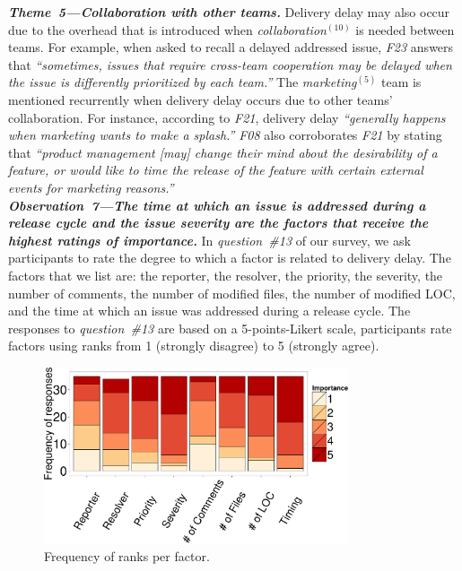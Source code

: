 \begin{sloppypar}
\noindent\textit{\textbf{Theme~5---Collaboration with other teams.}}
Delivery delay may also occur due to
the overhead that is introduced when {\em collaboration}$^{(10)}$ is needed
between teams. For example, when asked to recall a delayed addressed
issue, {\em F23} answers that {\em ``sometimes, issues that require cross-team
cooperation may be delayed when the issue is differently prioritized by each
team.''} The {\em marketing}$^{(5)}$ team is mentioned recurrently when
delivery delay occurs due to other teams' collaboration. For instance,
according to {\em F21}, delivery delay {\em ``generally happens when
marketing wants to make a splash.''} {\em F08} also corroborates  {\em F21} by
stating that {\em ``product management [may] change their mind about the
desirability of a feature, or would like to time the release of the feature with
certain external events for marketing reasons.''}\\

\noindent\textit{\textbf{Observation~7---The time at which an issue is addressed
during a release cycle and the issue severity are the factors that receive the
highest ratings of importance.}} In {\em
question~\#13} of our survey, we ask participants to rate the degree to which a
factor is related to delivery delay. The factors that we list are: the
reporter, the resolver, the priority, the severity, the number of comments, the
number of modified files, the number of modified LOC, and the time at which an
issue was addressed during a release cycle. The responses to {\em question~\#13}
are based on a 5-points-Likert scale, \ie participants rate factors using ranks from 1
(strongly disagree) to 5 (strongly agree). 

\begin{figure}
	\centering
	\includegraphics[width=0.80\textwidth,keepaspectratio]
	{chapters/chapter5/figures/rank_frequency.pdf}
	\caption{Frequency of ranks per factor.}
	\label{fig:rank_frequency}
\end{figure}


\end{sloppypar}
